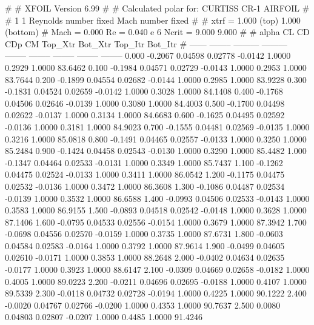 #  
#       XFOIL         Version 6.99
#  
# Calculated polar for: CURTISS CR-1 AIRFOIL                            
#  
# 1 1 Reynolds number fixed          Mach number fixed         
#  
# xtrf =   1.000 (top)        1.000 (bottom)  
# Mach =   0.000     Re =     0.040 e 6     Ncrit =   9.000  9.000
#  
#   alpha    CL        CD       CDp       CM     Top_Xtr  Bot_Xtr  Top_Itr  Bot_Itr
#  ------ -------- --------- --------- -------- -------- -------- -------- --------
   0.000  -0.2067   0.04598   0.02778  -0.0142   1.0000   0.2929   1.0000  83.6462
   0.100  -0.1984   0.04571   0.02729  -0.0143   1.0000   0.2953   1.0000  83.7644
   0.200  -0.1899   0.04554   0.02682  -0.0144   1.0000   0.2985   1.0000  83.9228
   0.300  -0.1831   0.04524   0.02659  -0.0142   1.0000   0.3028   1.0000  84.1408
   0.400  -0.1768   0.04506   0.02646  -0.0139   1.0000   0.3080   1.0000  84.4003
   0.500  -0.1700   0.04498   0.02622  -0.0137   1.0000   0.3134   1.0000  84.6683
   0.600  -0.1625   0.04495   0.02592  -0.0136   1.0000   0.3181   1.0000  84.9023
   0.700  -0.1555   0.04481   0.02569  -0.0135   1.0000   0.3216   1.0000  85.0818
   0.800  -0.1491   0.04465   0.02557  -0.0133   1.0000   0.3250   1.0000  85.2484
   0.900  -0.1424   0.04458   0.02543  -0.0130   1.0000   0.3290   1.0000  85.4482
   1.000  -0.1347   0.04464   0.02533  -0.0131   1.0000   0.3349   1.0000  85.7437
   1.100  -0.1262   0.04475   0.02524  -0.0133   1.0000   0.3411   1.0000  86.0542
   1.200  -0.1175   0.04475   0.02532  -0.0136   1.0000   0.3472   1.0000  86.3608
   1.300  -0.1086   0.04487   0.02534  -0.0139   1.0000   0.3532   1.0000  86.6588
   1.400  -0.0993   0.04506   0.02533  -0.0143   1.0000   0.3583   1.0000  86.9155
   1.500  -0.0893   0.04518   0.02542  -0.0148   1.0000   0.3628   1.0000  87.1406
   1.600  -0.0795   0.04533   0.02556  -0.0154   1.0000   0.3679   1.0000  87.3942
   1.700  -0.0698   0.04556   0.02570  -0.0159   1.0000   0.3735   1.0000  87.6731
   1.800  -0.0603   0.04584   0.02583  -0.0164   1.0000   0.3792   1.0000  87.9614
   1.900  -0.0499   0.04605   0.02610  -0.0171   1.0000   0.3853   1.0000  88.2648
   2.000  -0.0402   0.04634   0.02635  -0.0177   1.0000   0.3923   1.0000  88.6147
   2.100  -0.0309   0.04669   0.02658  -0.0182   1.0000   0.4005   1.0000  89.0223
   2.200  -0.0211   0.04696   0.02695  -0.0188   1.0000   0.4107   1.0000  89.5339
   2.300  -0.0118   0.04732   0.02728  -0.0194   1.0000   0.4225   1.0000  90.1222
   2.400  -0.0020   0.04767   0.02766  -0.0200   1.0000   0.4353   1.0000  90.7637
   2.500   0.0080   0.04803   0.02807  -0.0207   1.0000   0.4485   1.0000  91.4246
